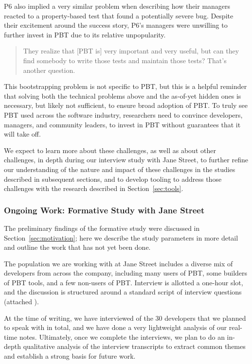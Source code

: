 P6 also implied a very similar problem when describing
how their managers reacted to a property-based test that found a potentially
severe bug. Despite their excitement around the success story, P6's
managers were unwilling to further invest in PBT due to its relative
unpopularity.
\begin{quote}
  They realize that [PBT is] very important and very useful, but can they find
  somebody to write those tests and maintain those tests? That's another
  question.
\end{quote}

This bootstrapping problem is not specific to PBT, but this is a helpful
reminder that solving both the
technical problems above and the as-of-yet hidden ones is necessary, but
likely not sufficient, to ensure broad adoption of PBT. To truly see PBT used across the software
industry, researchers need to convince developers, managers, and community
leaders, to invest in PBT without guarantees that it will take off.

We expect to learn more about these challenges, as well as about other challenges,
in depth during our interview study with Jane Street, to further refine our
understanding of the nature and impact of these challenges in the studies
described in subsequent sections, and to develop tooling to address
those challenges with the research described in Section~\ref{sec:tools}.

\subsubsection{Ongoing Work: Formative Study with Jane Street}
The preliminary findings of the formative study were discussed in
Section~\ref{sec:motivation}; here we describe the study parameters in more
detail and outline the work that has not yet been done.

The population we are working with at Jane Street includes a diverse mix of
developers from across the company, including many users of PBT, some builders
of PBT tools, and a few non-users of PBT. Interview is allotted a one-hour slot,
and the discussion is structured around a standard script of interview questions
(attached ).

At the time of writing, we have interviewed  of the 30 developers that we
planned to speak with in total, and we have done a very lightweight analysis of
our real-time notes. Ultimately, once we complete the interviews, we plan to do
an in-depth qualitative analysis of the interview transcripts to extract common
themes and establish a strong basis for future work.

